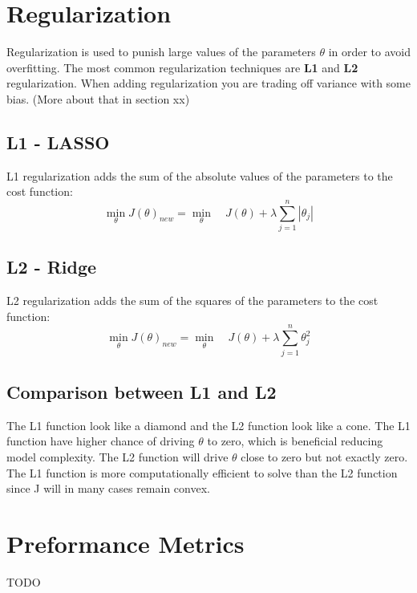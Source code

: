 \section{Regularization}
Regularization is used to punish large values of the parameters $\theta$ in order to avoid overfitting. The most common regularization techniques are \textbf{L1} and \textbf{L2} regularization. When adding regularization you are trading off variance with some bias. (More about that in section xx) \newline

\subsection{L1 - LASSO}
L1 regularization adds the sum of the absolute values of the parameters to the cost function:
\begin{equation}
    \min_{\theta} J(\theta)_{new} = \min_{\theta} \quad J(\theta) + \lambda \sum_{j=1}^{n} |\theta_j|
\end{equation}


\subsection{L2 - Ridge}
L2 regularization adds the sum of the squares of the parameters to the cost function:
\begin{equation}
    \min_{\theta} J(\theta)_{new} = \min_{\theta} \quad J(\theta) + \lambda \sum_{j=1}^{n} \theta_j^2
\end{equation}

\subsection{Comparison between L1 and L2}
The L1 function look like a diamond and the L2 function look like a cone. The L1 function have higher chance of driving $\theta$ to zero, which is beneficial reducing model complexity. The L2 function will drive $\theta$ close to zero but not exactly zero. The L1 function is more computationally efficient to solve than the L2 function since J will in many cases remain convex.

\section{Preformance Metrics}
TODO

